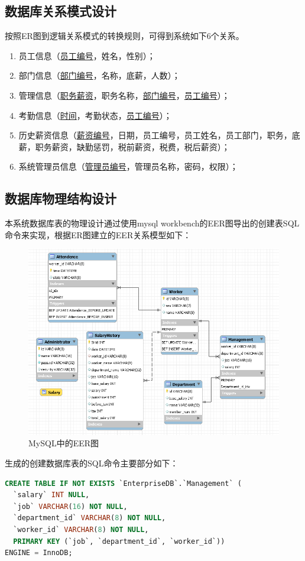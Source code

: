 \documentclass[withoutpreface,bwprint]{cumcmthesis} %
\begin{document}
\subsection{数据库关系模式设计}
按照ER图到逻辑关系模式的转换规则，可得到系统如下6个关系。
\begin{enumerate}
	\item 员工信息（\uline{员工编号}，姓名，性别）；
	\item 部门信息（\uline{部门编号}，名称，底薪，人数）；
	\item 管理信息（\uline{职务薪资}，职务名称，\uline{部门编号}，\uline{员工编号}）；
	\item 考勤信息（\uline{时间}，考勤状态，\uline{员工编号}）；
	\item 历史薪资信息（\uline{薪资编号}，日期，员工编号，员工姓名，员工部门，职务，底薪，职务薪资，缺勤惩罚，税前薪资，税费，税后薪资）；
	\item 系统管理员信息（\uline{管理员编号}，管理员名称，密码，权限）；
\end{enumerate}


\subsection{数据库物理结构设计}
本系统数据库表的物理设计通过使用mysql workbench的EER图导出的创建表SQL命令来实现，根据ER图建立的EER关系模型如下：
\begin{figure}[H]
    \centering
    \includegraphics[width=1\linewidth]{EERGraph}
    \caption{MySQL中的EER图}
    \label{EER}
\end{figure}
生成的创建数据库表的SQL命令主要部分如下：
\begin{lstlisting}[language=SQL]
CREATE TABLE IF NOT EXISTS `EnterpriseDB`.`Management` (
  `salary` INT NULL,
  `job` VARCHAR(16) NOT NULL,
  `department_id` VARCHAR(8) NOT NULL,
  `worker_id` VARCHAR(8) NOT NULL,
  PRIMARY KEY (`job`, `department_id`, `worker_id`))
ENGINE = InnoDB;
\end{lstlisting}
\end{document}
